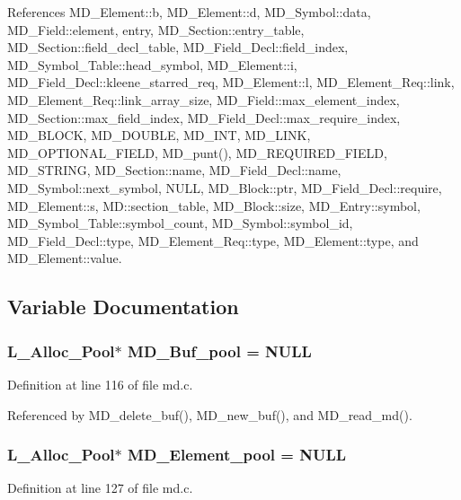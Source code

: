 References MD\_\-Element::b, MD\_\-Element::d, MD\_\-Symbol::data, MD\_\-Field::element, entry, MD\_\-Section::entry\_\-table, MD\_\-Section::field\_\-decl\_\-table, MD\_\-Field\_\-Decl::field\_\-index, MD\_\-Symbol\_\-Table::head\_\-symbol, MD\_\-Element::i, MD\_\-Field\_\-Decl::kleene\_\-starred\_\-req, MD\_\-Element::l, MD\_\-Element\_\-Req::link, MD\_\-Element\_\-Req::link\_\-array\_\-size, MD\_\-Field::max\_\-element\_\-index, MD\_\-Section::max\_\-field\_\-index, MD\_\-Field\_\-Decl::max\_\-require\_\-index, MD\_\-BLOCK, MD\_\-DOUBLE, MD\_\-INT, MD\_\-LINK, MD\_\-OPTIONAL\_\-FIELD, MD\_\-punt(), MD\_\-REQUIRED\_\-FIELD, MD\_\-STRING, MD\_\-Section::name, MD\_\-Field\_\-Decl::name, MD\_\-Symbol::next\_\-symbol, NULL, MD\_\-Block::ptr, MD\_\-Field\_\-Decl::require, MD\_\-Element::s, MD::section\_\-table, MD\_\-Block::size, MD\_\-Entry::symbol, MD\_\-Symbol\_\-Table::symbol\_\-count, MD\_\-Symbol::symbol\_\-id, MD\_\-Field\_\-Decl::type, MD\_\-Element\_\-Req::type, MD\_\-Element::type, and MD\_\-Element::value.

\subsection{Variable Documentation}
\subsubsection{\setlength{\rightskip}{0pt plus 5cm}\bf{L\_\-Alloc\_\-Pool}$\ast$ \bf{MD\_\-Buf\_\-pool} = NULL\hspace{0.3cm}{\tt  [static]}}\label{md_8c_9ebe1097a5690d807be04dfd0719e693}




Definition at line 116 of file md.c.

Referenced by MD\_\-delete\_\-buf(), MD\_\-new\_\-buf(), and MD\_\-read\_\-md().
\subsubsection{\setlength{\rightskip}{0pt plus 5cm}\bf{L\_\-Alloc\_\-Pool}$\ast$ \bf{MD\_\-Element\_\-pool} = NULL\hspace{0.3cm}{\tt  [static]}}\label{md_8c_d0caf7d06f7c1d2fc7a3d7b0c3a5b956}




Definition at line 127 of file md.c.

